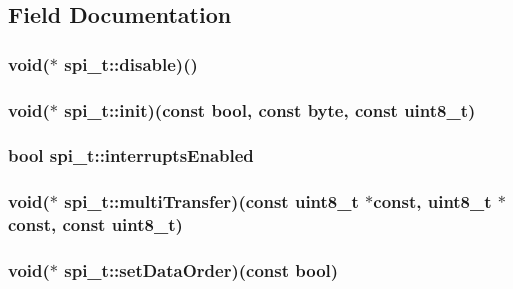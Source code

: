 \subsection{Field Documentation}
\hypertarget{a00008_a57d499a7d38ead0a94592ff9bc95e197}{
\subsubsection[{disable}]{\setlength{\rightskip}{0pt plus 5cm}void($\ast$ spi\-\_\-t\-::disable)()}}\label{a00008_a57d499a7d38ead0a94592ff9bc95e197}
\hypertarget{a00008_ab9c4dfca1c1af728c12afa53a6af3116}{
\subsubsection[{init}]{\setlength{\rightskip}{0pt plus 5cm}void($\ast$ spi\-\_\-t\-::init)(const bool, const {\bf byte}, const uint8\-\_\-t)}}\label{a00008_ab9c4dfca1c1af728c12afa53a6af3116}
\hypertarget{a00008_aa4467a109fa5d9e59a4b36f4a9728987}{
\subsubsection[{interrupts\-Enabled}]{\setlength{\rightskip}{0pt plus 5cm}bool spi\-\_\-t\-::interrupts\-Enabled}}\label{a00008_aa4467a109fa5d9e59a4b36f4a9728987}
\hypertarget{a00008_a469d031f7b9ff3389e7234f742421dc9}{
\subsubsection[{multi\-Transfer}]{\setlength{\rightskip}{0pt plus 5cm}void($\ast$ spi\-\_\-t\-::multi\-Transfer)(const uint8\-\_\-t $\ast$const, uint8\-\_\-t $\ast$const, const uint8\-\_\-t)}}\label{a00008_a469d031f7b9ff3389e7234f742421dc9}
\hypertarget{a00008_a0f77f6f3d49a8247eaa9c2e9a23194b0}{
\subsubsection[{set\-Data\-Order}]{\setlength{\rightskip}{0pt plus 5cm}void($\ast$ spi\-\_\-t\-::set\-Data\-Order)(const bool)}}\label{a00008_a0f77f6f3d49a8247eaa9c2e9a23194b0}
